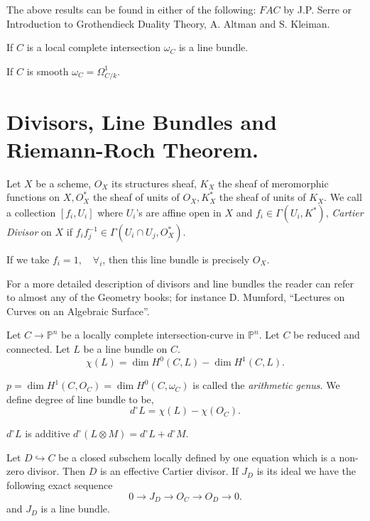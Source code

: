 The above results can be found in either of the following: $FAC$ by
J.P. Serre or Introduction to Grothendieck Duality Theory, A. Altman
and S. Kleiman.
\begin{example}\label{chap1:exm1}
If $C$ is a local complete intersection $\omega_C$ is a line bundle.
\end{example}

\begin{example}\label{chap1:exm2}
If $C$ is smooth $\omega_C=\Omega_{C/k}^1$. 
\end{example}

\section{Divisors, Line Bundles and Riemann-Roch
  Theorem.}\label{chap1:sec4} Let $X$ be a scheme, $O_X$ its
structures sheaf, $K_X$ the sheaf of meromorphic functions on
$X,O_X^*$ the sheaf of units of $O_X,K_X^*$ the sheaf of units of
$K_X$. We call a collection $[f_i,U_i]$ where $U_i$'s are affine open
in $X$ and $f_i\in\Gamma(U_i,K^*)$, {\it Cartier Divisor} on $X$ if
$f_if_j^{-1}\in\Gamma(U_i\cap U_j,O_X^*)$.
\begin{example*}
If we take $f_i=1,\quad\forall_i$, then this line bundle is precisely
$O_X$. 

For a more detailed description of divisors and line bundles the
reader can refer to almost any of the Geometry books; for instance
D. Mumford, ``Lectures on Curves on an Algebraic Surface''.

Let $C\longrightarrow\mathbb{P}^n$ be a locally complete
intersection-curve in $\mathbb{P}^n$. Let $C$ be reduced and
connected. Let $L$ be a line bundle on $C$.
$$
\chi (L)=\dim H^0(C,L)-\dim H^1(C,L).
$$

$p=\dim H^1(C,O_C)=\dim H^0(C,\omega_C)$ is called the {\it arithmetic
  genus}. We define degree of line bundle to be,
$$
d^\circ L=\chi(L)- \chi(O_C).
$$\pageoriginale
\end{example*}

\begin{RRochthm*}\label{chap1:RRthm}
$d^\circ L$ is additive \ie $d^\circ(L\otimes M)=d^\circ L+d^\circ
M$. 

Let $D\hookrightarrow C$ be a closed subschem locally defined by one
equation which is a non-zero divisor. Then $D$ is an effective Cartier
divisor. If $J_D$ is its ideal we have the following exact sequence
$$
0\longrightarrow J_D\longrightarrow O_C\longrightarrow O_D
\longrightarrow 0.
$$
and $J_D$ is a line bundle.
\end{RRochthm*}

